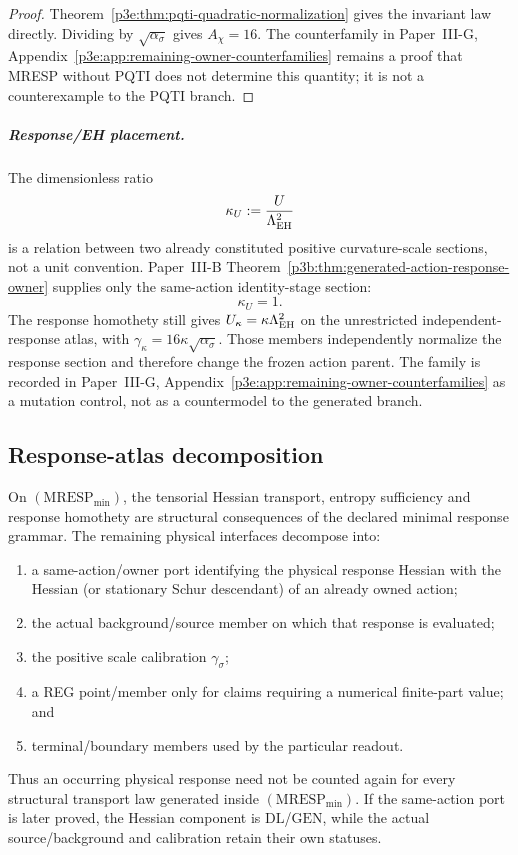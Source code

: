 \documentclass[12pt,a4paper]{article}
\begin{document}
\begin{proof}
Theorem~\ref{p3e:thm:pqti-quadratic-normalization} gives the invariant law
directly.  Dividing by \(\sqrt{\alpha_\sigma}\) gives
\(A_\chi=16\).  The counterfamily in
Paper~III-G, Appendix~\ref{p3e:app:remaining-owner-counterfamilies} remains a proof that
MRESP without PQTI does not determine this quantity; it is not a
counterexample to the PQTI branch.
\end{proof}

\subparagraph{Response/EH placement.}
The dimensionless ratio
\[
 \kappa_U:=\frac{U}{\Lambda_{\rm EH}^2}
\]
is a relation between two already constituted positive curvature-scale
sections, not a unit convention.  Paper~III-B
Theorem~\ref{p3b:thm:generated-action-response-owner} supplies only the
same-action identity-stage section:
\[
 \boxed{\kappa_U=1.}
\]
The response homothety still gives
$U_\kappa=\kappa\Lambda_{\rm EH}^2$ on the unrestricted
independent-response atlas, with
\(\gamma_\kappa=16\kappa\sqrt{\alpha_\sigma}\).  Those members independently
normalize the response section and therefore change the frozen action parent.
The family is recorded in
Paper~III-G, Appendix~\ref{p3e:app:remaining-owner-counterfamilies} as a mutation control,
not as a countermodel to the generated branch.


\subsection{Response-atlas decomposition}
\label{p3e:sec:v236-mresp-atlas}
\begin{proposition}
\label{p3e:prop:v236-mresp-decomposition}
On \((\mathrm{MRESP}_{\min})\), the tensorial Hessian transport, entropy
sufficiency and response homothety are structural consequences of the declared
minimal response grammar.  The remaining physical interfaces decompose into:
\begin{enumerate}[label=(\roman*),leftmargin=2.2em]
\item a same-action/owner port identifying the physical response Hessian with
the Hessian (or stationary Schur descendant) of an already owned action;
\item the actual background/source member on which that response is evaluated;
\item the positive scale calibration \(\gamma_\sigma\);
\item a REG point/member only for claims requiring a numerical finite-part
value; and
\item terminal/boundary members used by the particular readout.
\end{enumerate}
Thus an occurring physical response need not be counted again for every
structural transport law generated inside \((\mathrm{MRESP}_{\min})\).
If the same-action port is later proved, the Hessian component is
\(\mathrm{DL}\)/\(\mathrm{GEN}\), while the actual source/background and
calibration retain their own statuses.
\end{proposition}
\end{document}
